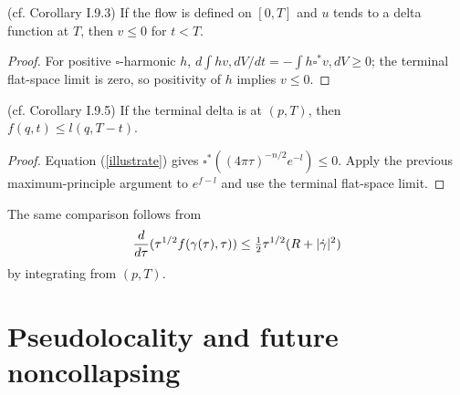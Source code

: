 \begin{corollary}
  \label{cor:kl-perelman-s-differential-harnack-inequality-harnack-inequalities-corollary}
  (cf. Corollary I.9.3) \label{corI.9.3}
If the flow is defined on $[0,T]$ and $u$ tends to a delta function at $T$, then
$v\le0$ for $t<T$.
\end{corollary}
\begin{proof}
\sketch
For positive $\square$-harmonic $h$, $d\int hv,dV/dt=-\int h\square^*v,dV\ge0$;
the terminal flat-space limit is zero, so positivity of $h$ implies $v\le0$.
\end{proof}
\begin{corollary}
  \label{cor:kl-perelman-s-differential-harnack-inequality-convergence-harnack-inequalities}
  (cf. Corollary I.9.5) \label{compare}
If the terminal delta is at $(p,T)$, then $f(q,t)\le l(q,T-t)$.
\end{corollary}
\begin{proof}
\sketch
Equation (\ref{illustrate}) gives $\square^*((4\pi\tau)^{-n/2}e^{-l})\le0$.
Apply the previous maximum-principle argument to $e^{f-l}$ and use the terminal
flat-space limit.
\end{proof}
\begin{remark}
  \label{rem:kl-perelman-s-differential-harnack-inequality-structural-remark-harnack-inequalities}
The same comparison follows from
\begin{equation}
{d\over d\tau}(\tau^{1/2}f(\gamma(\tau),\tau))\le\tfrac12\tau^{1/2}(R+|\dot\gamma|^2)
\end{equation}
by integrating from $(p,T)$.
\end{remark}

\section{Pseudolocality and future noncollapsing}
